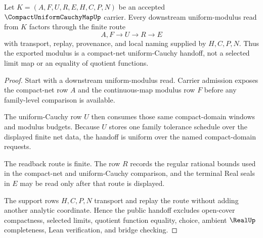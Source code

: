 \begin{theorem}
\label{thm:compact-uniform-cauchy-map-uniform-modulus-handoff}
Let $K=(A,F,U,R,E,H,C,P,N)$ be an accepted $\CompactUniformCauchyMapUp$ carrier. Every downstream uniform-modulus read from $K$ factors through the finite route
$$
A,F \longrightarrow U \longrightarrow R \longrightarrow E
$$
with transport, replay, provenance, and local naming supplied by $H,C,P,N$. Thus the exported modulus is a compact-net uniform-Cauchy handoff, not a selected limit map or an equality of quotient functions.
\end{theorem}
\begin{proof}
Start with a downstream uniform-modulus read. Carrier admission exposes the compact-net row $A$ and the continuous-map modulus row $F$ before any family-level comparison is available.

The uniform-Cauchy row $U$ then consumes those same compact-domain windows and modulus budgets. Because $U$ stores one family tolerance schedule over the displayed finite net data, the handoff is uniform over the named compact-domain requests.

The readback route is finite. The row $R$ records the regular rational bounds used in the compact-net and uniform-Cauchy comparison, and the terminal Real seals in $E$ may be read only after that route is displayed.

The support rows $H,C,P,N$ transport and replay the route without adding another analytic coordinate. Hence the public handoff excludes open-cover compactness, selected limits, quotient function equality, choice, ambient $\RealUp$ completeness, Lean verification, and bridge checking.
\end{proof}


\begin{closurestatus}{\CompactUniformCauchyMapUp}
  \theoryclosure{\seedClosure}
  \formalstatus{\unformalizedV}
\end{closurestatus}
